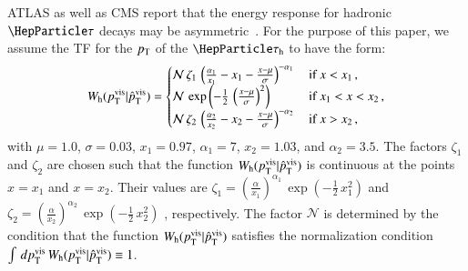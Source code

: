ATLAS as well as CMS report that the energy response for hadronic
$\Pgt$ decays may be asymmetric~\cite{ATLAS:2011tfa,PRF-14-001}.
For the purpose of this paper, we assume the TF for the $p_{\textrm{T}}$ of the
$\tauh$ to have the form:
\begin{equation}
W_{\textrm{h}}( p_{\textrm{T}}^{\textrm{vis}} | \hat{p}_{\textrm{T}}^{\textrm{vis}} ) = 
 \begin{cases}
   \mathcal{N} \, \zeta_{1} \, \left( \frac{\alpha_{1}}{x_{1}} - x_{1} - \frac{x - \mu}{\sigma} \right)^{-\alpha_{1}} \,  
 & \mbox{if } x < x_{1} \, , \\
   \mathcal{N} \, \exp\left( -\frac{1}{2} \, \left( \frac{x - \mu}{\sigma} \right)^{2} \right) \,
 & \mbox{if } x_{1} < x < x_{2} \, , \\
   \mathcal{N} \, \zeta_{2} \, \left( \frac{\alpha_{2}}{x_{2}} - x_{2} - \frac{x - \mu}{\sigma} \right)^{-\alpha_{2}} \,
 & \mbox{if } x > x_{2} \, ,
 \end{cases}
\label{eq:tf_tauToHadDecays_pT}
\end{equation}
with $\mu = 1.0$, $\sigma = 0.03$, $x_{1} = 0.97$, $\alpha_{1} = 7$,
$x_{2} = 1.03$, and $\alpha_{2} = 3.5$.
The factors $\zeta_{1}$ and $\zeta_{2}$ are chosen such that the
function $W_{\textrm{h}}( p_{\textrm{T}}^{\textrm{vis}} | \hat{p}_{\textrm{T}}^{\textrm{vis}} )$ is continuous at
the points $x = x_{1}$ and $x = x_{2}$. 
Their values are $\zeta_{1} = \left( \frac{\alpha}{x_{1}}
\right)^{\alpha_{1}} \, \exp\left( -\frac{1}{2} \, x_{1}^{2} \right)$ and $\zeta_{2} = \left( \frac{\alpha}{x_{2}}
\right)^{\alpha_{2}} \, \exp\left( -\frac{1}{2} \, x_{2}^{2} \right)$
, respectively.
The factor $\mathcal{N}$ is determined by the condition that the function $W_{\textrm{h}}( p_{\textrm{T}}^{\textrm{vis}} | \hat{p}_{\textrm{T}}^{\textrm{vis}} )$ 
satisfies the normalization condition $\int \, dp_{\textrm{T}}^{\textrm{vis}} \, W_{\textrm{h}}( p_{\textrm{T}}^{\textrm{vis}} | \hat{p}_{\textrm{T}}^{\textrm{vis}} ) \equiv 1$.

